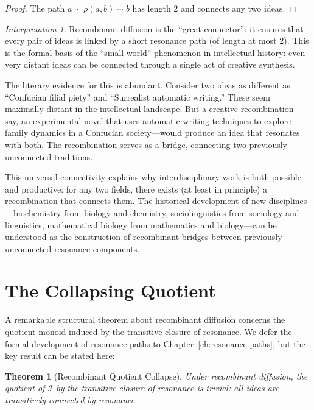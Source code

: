 \documentclass[11pt,openany]{book}
\theoremstyle{definition}
\theoremstyle{plain}
\newtheorem{theorem}[axiom]{Theorem}
\theoremstyle{remark}
\newtheorem{interpretation}[axiom]{Interpretation}
\newcommand{\IS}{\mathcal{I}}               %
\newcommand{\res}{\sim}                      %
\begin{document}
\begin{proof}
The path $a \res \rho(a, b) \res b$ has length 2 and connects any two ideas.
\end{proof}

\begin{interpretation}
Recombinant diffusion is the ``great connector'': it ensures that every pair of ideas is linked by a short resonance path (of length at most 2). This is the formal basis of the ``small world'' phenomenon in intellectual history: even very distant ideas can be connected through a single act of creative synthesis.

The literary evidence for this is abundant. Consider two ideas as different as ``Confucian filial piety'' and ``Surrealist automatic writing.'' These seem maximally distant in the intellectual landscape. But a creative recombination---say, an experimental novel that uses automatic writing techniques to explore family dynamics in a Confucian society---would produce an idea that resonates with both. The recombination serves as a bridge, connecting two previously unconnected traditions.

This universal connectivity explains why interdisciplinary work is both possible and productive: for any two fields, there exists (at least in principle) a recombination that connects them. The historical development of new disciplines---biochemistry from biology and chemistry, sociolinguistics from sociology and linguistics, mathematical biology from mathematics and biology---can be understood as the construction of recombinant bridges between previously unconnected resonance components.
\end{interpretation}

\section{The Collapsing Quotient}

A remarkable structural theorem about recombinant diffusion concerns the quotient monoid induced by the transitive closure of resonance. We defer the formal development of resonance paths to Chapter~\ref{ch:resonance-paths}, but the key result can be stated here:

\begin{theorem}[Recombinant Quotient Collapse]
Under recombinant diffusion, the quotient of $\IS$ by the transitive closure of resonance is trivial: all ideas are transitively connected by resonance.
\end{theorem}
\end{document}
